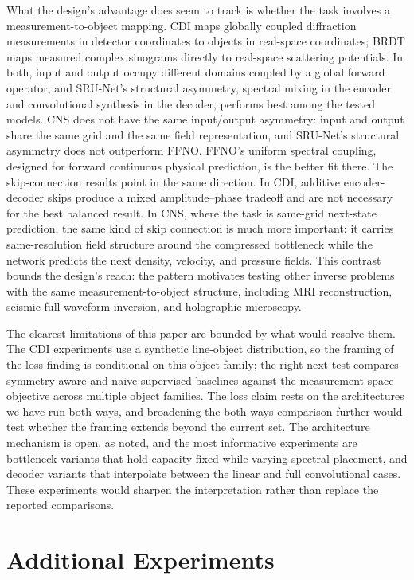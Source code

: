\documentclass[11pt]{article}
\begin{document}
What the design's advantage does seem to track is whether the task involves
a measurement-to-object mapping. CDI maps globally coupled diffraction
measurements in detector coordinates to objects in real-space coordinates;
BRDT maps measured complex sinograms directly to real-space scattering
potentials. In both, input and output occupy different domains
coupled by a global forward operator, and SRU-Net's structural asymmetry,
spectral mixing in the encoder and convolutional synthesis in the decoder,
performs best among the tested models. CNS does not have the same input/output
asymmetry: input and output share the same grid and the same field
representation, and SRU-Net's structural asymmetry does not outperform FFNO.
FFNO's uniform spectral coupling, designed for forward continuous physical
prediction, is the better fit there. The skip-connection results point in the
same direction. In CDI, additive encoder-decoder skips produce a mixed
amplitude--phase tradeoff and are not necessary for the best balanced result.
In CNS, where the task is same-grid next-state prediction, the same kind of skip
connection is much more important: it carries same-resolution field structure
around the compressed bottleneck while the network predicts the next density,
velocity, and pressure fields. This contrast bounds the design's reach: the
pattern motivates testing other inverse problems with the same
measurement-to-object structure, including MRI reconstruction, seismic
full-waveform inversion, and holographic microscopy.

The clearest limitations of this paper are bounded by what would resolve them.
The CDI experiments use a synthetic line-object distribution, so the framing
of the loss finding is conditional on this object family; the right next test
compares symmetry-aware and naive supervised baselines against the
measurement-space objective across multiple object families. The loss claim
rests on the architectures we have run both ways, and broadening the
both-ways comparison further would test whether the framing extends beyond
the current set. The architecture mechanism is open, as noted, and the most
informative experiments are bottleneck variants that hold capacity fixed
while varying spectral placement, and decoder variants that interpolate
between the linear and full convolutional cases. These experiments would
sharpen the interpretation rather than replace the reported comparisons.

\iffalse
\section{Additional Experiments}
\end{document}
